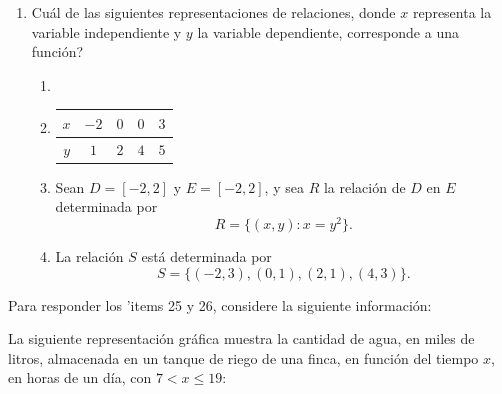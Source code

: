 \documentclass[12pt]{article}
\begin{document}
\begin{enumerate}[label=\textbf{\arabic*.}, start=24, itemsep=2.5cm]

\Needspace{0.92\textheight}
\item
\textquestiondown Cu\'al de las siguientes representaciones de relaciones, donde $x$ representa la variable independiente y $y$ la variable dependiente, corresponde a una funci\'on?

\begin{enumerate}[label=\Alph*), itemsep=0.45cm, topsep=5pt, parsep=0pt]

\item
{}

\item
\renewcommand{\arraystretch}{1.45}
\begin{tabular}{|c|c|c|c|c|}
  \hline
  $x$ & $-2$ & $0$ & $0$ & $3$ \\ \hline
  $y$ & $1$ & $2$ & $4$ & $5$ \\ \hline
\end{tabular}

\item
Sean $D=[-2,2]$ y $E=[-2,2]$, y sea $R$ la relaci\'on de $D$ en $E$ determinada por
\[
  R=\{(x,y):x=y^2\}.
\]

\item
La relaci\'on $S$ est\'a determinada por
\[
  S=\{(-2,3),(0,1),(2,1),(4,3)\}.
\]

\end{enumerate}

\end{enumerate}

\newpage

\noindent Para responder los 'items 25 y 26, considere la siguiente informaci\'on:

La siguiente representaci\'on gr\'afica muestra la cantidad de agua, en miles de litros, almacenada en un tanque de riego de una finca, en funci\'on del tiempo $x$, en horas de un d\'ia, con $7<x\leq 19$:
\end{document}
